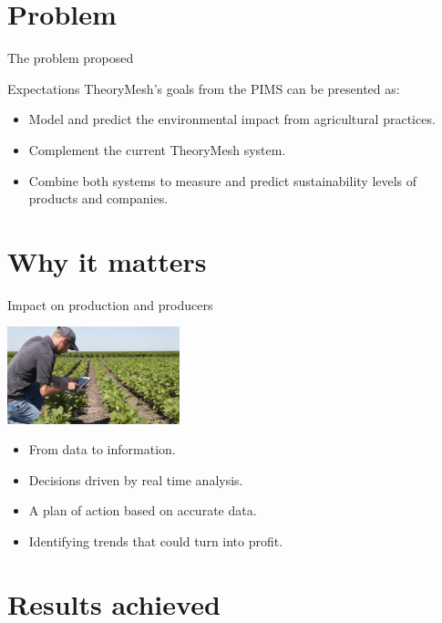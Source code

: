\documentclass[t,9pt,aspectratio=169]{beamer}
\begin{document}
\section{Problem}
\begin{frame}{The problem proposed}
\begin{block}{Expectations}
	TheoryMesh’s goals from the PIMS can be presented as:
	
	\begin{itemize}
		\item Model and predict the environmental impact from agricultural practices.
		
		\item Complement the current TheoryMesh system.
		
		\item Combine both systems to measure and predict sustainability levels of products and companies.
	\end{itemize}

\end{block}	
\end{frame}

\section{Why it matters}
\begin{frame}{Impact on production and producers}
	\begin{center}
		\includegraphics[width = 5cm]{./figures/HTF.jpg}
	\end{center}

	\begin{itemize}
		\item From data to information.
		\item Decisions driven by real time analysis.
		\item A plan of action based on accurate data.
		\item Identifying trends that could turn into profit.
	\end{itemize}
\end{frame}

\section{Results achieved}
\end{document}
